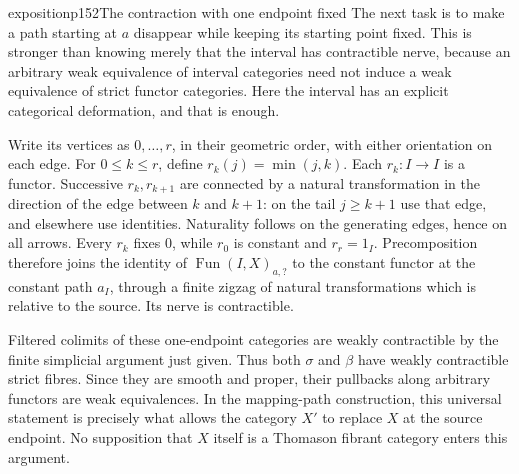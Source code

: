 \begin{dcomment}{exposition}{p152}{The contraction with one endpoint fixed}
The next task is to make a path starting at $a$ disappear while keeping its starting point fixed. This is stronger than knowing merely that the interval has contractible nerve, because an arbitrary weak equivalence of interval categories need not induce a weak equivalence of strict functor categories. Here the interval has an explicit categorical deformation, and that is enough.

Write its vertices as $0,\ldots,r$, in their geometric order, with either orientation on each edge. For $0\leq k\leq r$, define $r_k(j)=\min(j,k)$. Each $r_k:I\to I$ is a functor. Successive $r_k,r_{k+1}$ are connected by a natural transformation in the direction of the edge between $k$ and $k+1$: on the tail $j\geq k+1$ use that edge, and elsewhere use identities. Naturality follows on the generating edges, hence on all arrows. Every $r_k$ fixes $0$, while $r_0$ is constant and $r_r=1_I$. Precomposition therefore joins the identity of $\operatorname{Fun}(I,X)_{a,?}$ to the constant functor at the constant path $a_I$, through a finite zigzag of natural transformations which is relative to the source. Its nerve is contractible.

Filtered colimits of these one-endpoint categories are weakly contractible by the finite simplicial argument just given. Thus both $\sigma$ and $\beta$ have weakly contractible strict fibres. Since they are smooth and proper, their pullbacks along arbitrary functors are weak equivalences. In the mapping-path construction, this universal statement is precisely what allows the category $X'$ to replace $X$ at the source endpoint. No supposition that $X$ itself is a Thomason fibrant category enters this argument.
\end{dcomment}

